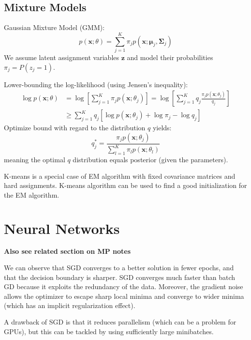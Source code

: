 \documentclass[12pt]{article}
\begin{document}
\subsection{Mixture Models}
Gaussian Mixture Model (GMM):
\[ p(\mathbf{x};\theta) = \sum_{j=1}^K \pi_j p(\mathbf{x};\mathbf{\mu}_j , \mathbf{\Sigma}_j) \]
We assume latent assignment variables $\mathbf{z}$ and model their probabilities $\pi_j = P(z_j = 1)$.
\par Lower-bounding the log-likelihood (using Jensen's inequality):
\begin{equation*}
\begin{split}
\log p(\mathbf{x};\theta) &= \log \left[ \sum_{j=1}^K \pi_j p(\mathbf{x};\theta_j) \right] = \log \left[ \sum_{j=1}^K q_j \frac{\pi_j p(\mathbf{x};\theta_j)}{q_j} \right] \\
& \geq \sum_{j=1}^K q_j [\log p(\mathbf{x};\theta_j) + \log \pi_j - \log{q_j}]
\end{split}
\end{equation*}
Optimize bound with regard to the distribution $q$ yields:
\[ q_j^* = \frac{\pi_j p(\mathbf{x};\theta_j)}{\sum_{l=1}^K \pi_l p(\mathbf{x};\theta_l)} \]
meaning the optimal $q$ distribution equals posterior (given the parameters).
\par K-means is a special case of EM algorithm with fixed covariance matrices and hard assignments. K-means algorithm can be used to find a good initialization for the EM algorithm.

\section{Neural Networks}
\textbf{Also see related section on MP notes}
\par We can observe that SGD converges to a better solution in fewer epochs, and that the decision boundary is sharper. SGD converges much faster than batch GD because it exploits the redundancy of the data. Moreover, the gradient noise allows the optimizer to escape sharp local minima and converge to wider minima (which has an implicit regularization effect).
\par A drawback of SGD is that it reduces parallelism (which can be a problem for GPUs), but this can be tackled by using sufficiently large minibatches.
\end{document}
